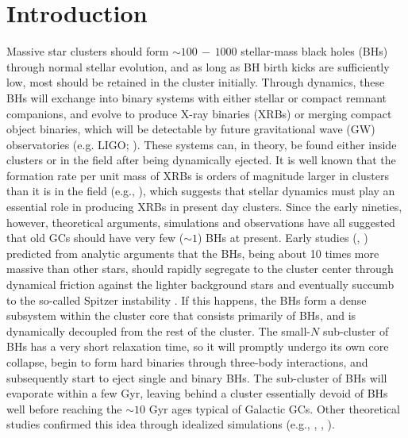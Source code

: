 \documentclass[12pt,preprint]{aastex}
\begin{document}
\section{Introduction} \label{Intro}

Massive star clusters should form $\sim 100\, -\, 1000$ stellar-mass black holes (BHs) 
through normal stellar evolution, and as long as BH birth kicks are sufficiently low, most
should be retained in the cluster initially. Through dynamics, these BHs will exchange into
binary systems with either 
stellar or compact remnant companions, and evolve to produce X-ray binaries (XRBs) or 
merging compact object binaries, which will be detectable by future gravitational wave 
(GW) observatories (e.g. LIGO; \citealt{HarryLIGO2010}). These systems can, in theory, 
be found either inside clusters or in the field after being dynamically ejected. 
It is well known that the formation rate 
per unit mass of XRBs is orders of magnitude larger in clusters than it is in the field
(e.g., \citealt{Pooley2003}), which suggests that stellar dynamics must play an essential
role in producing XRBs in present day clusters. Since the early nineties, however,  
theoretical arguments, simulations and observations have all suggested that old GCs 
should have very few ($\sim1$) BHs at present. Early studies (\citealt{Kulkarni1993}, 
\citealt{Sigurdsson1993}) predicted from analytic arguments that the BHs, being about
10 times more massive than other stars, should rapidly segregate to the cluster center through dynamical friction
against the lighter background stars and eventually succumb to the so-called Spitzer
instability \citep{Spitzer1969, Kulkarni1993}. If this happens, the BHs form a dense 
subsystem within the cluster core that consists primarily of BHs, and is dynamically 
decoupled from the rest of the cluster. The small-$N$ sub-cluster of BHs has a very short relaxation 
time, so it will promptly undergo its own core collapse, begin to form hard binaries through three-body 
interactions, and subsequently start to eject single and binary BHs. The sub-cluster of BHs 
will evaporate within a few Gyr, leaving behind a cluster essentially devoid of 
BHs well before reaching the $\sim 10$ Gyr ages typical of Galactic GCs. 
Other theoretical studies confirmed this idea through idealized simulations 
(e.g., \citealt{PortegiesZwart2000}, \citealt{OLeary2006}, \citealt{Banerjee2010}). 
\end{document}
